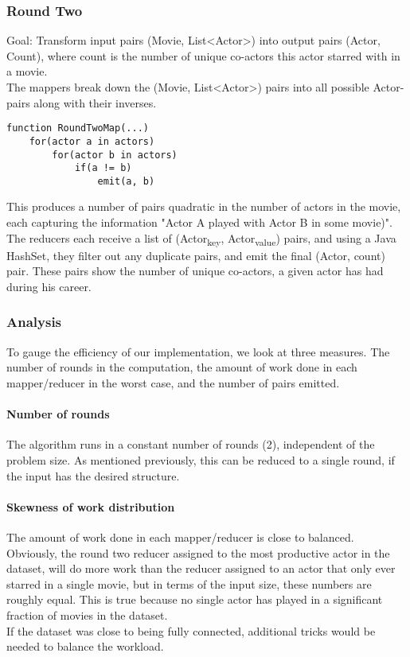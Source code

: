 \documentclass[a4paper,11pt]{article}
\begin{document}
\subsubsection{Round Two}
\label{sub}
Goal: Transform input pairs (Movie, List<Actor>) into output pairs (Actor, Count), where count is the number of unique co-actors this actor starred with in a movie.\\

The mappers break down the (Movie, List<Actor>) pairs into all possible Actor-pairs along with their inverses.

\begin{verbatim}
function RoundTwoMap(...)
    for(actor a in actors)
        for(actor b in actors)
            if(a != b)
                emit(a, b)
\end{verbatim}

This produces a number of pairs quadratic in the number of actors in the movie, each capturing the information "Actor A played with Actor B in some movie)".\\

The reducers each receive a list of (Actor\textsubscript{key}, Actor\textsubscript{value}) pairs, and using a Java HashSet, they filter out any duplicate pairs, and emit the final (Actor, count) pair. These pairs show the number of unique co-actors, a given actor has had during his career.

\subsubsection{Analysis}
To gauge the efficiency of our implementation, we look at three measures. The number of rounds in the computation, the amount of work done in each mapper/reducer in the worst case, and the number of pairs emitted.

\paragraph{Number of rounds}
The algorithm runs in a constant number of rounds (2), independent of the problem size. As mentioned previously, this can be reduced to a single round, if the input has the desired structure.

\paragraph{Skewness of work distribution}
The amount of work done in each mapper/reducer is close to balanced. Obviously, the round two reducer assigned to the most productive actor in the dataset, will do more work than the reducer assigned to an actor that only ever starred in a single movie, but in terms of the input size, these numbers are roughly equal. This is true because no single actor has played in a significant fraction of movies in the dataset.\\
If the dataset was close to being fully connected, additional tricks would be needed to balance the workload.
\end{document}
